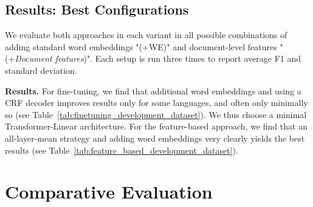 \subsection{Results: Best Configurations}
\vspace{-1mm}

We evaluate both approaches in each variant in all possible combinations of adding standard word embeddings "(+WE)" and document-level features "(+\textit{Document features})". Each setup is run three times to report average F1 and standard deviation.

\noindent
\textbf{Results.} For fine-tuning, we find that additional word embeddings and using a CRF decoder improves results only for some languages, and often only minimally so (see Table~\ref{tab:finetuning_development_dataset}). We thus choose a minimal Transformer-Linear architecture. For the feature-based approach, we find that an all-layer-mean strategy and adding word embeddings very clearly yields the best results (see Table~\ref{tab:feature_based_development_dataset}). 

\begin{table}
\centering
{}
\vspace{-2mm}
\caption{Comparative evaluation of context window sizes of fine-tuning approach on development set.}
\label{tab:comparison_different_context_window_sizes}
\end{table}

\section{Comparative Evaluation}
\label{sec:evaluation}
\vspace{-1mm}

